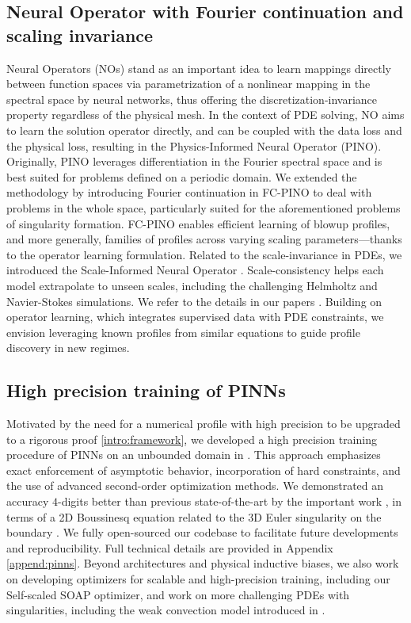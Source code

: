 \documentclass[12pt]{caltech_thesis}
\numberwithin{equation}{section}
\begin{document}
\subsection{Neural Operator with Fourier continuation and scaling invariance}
\label{subsec:no}
Neural Operators (NOs) \cite{li2020fourier,kovachki2023neural} stand as an important idea to learn mappings directly between function spaces via parametrization of a nonlinear mapping in the spectral space by neural networks, thus offering the discretization-invariance property regardless of the physical mesh. In the context of PDE solving, NO aims to learn the solution operator directly, and can be coupled with the data loss and the physical loss, resulting in the Physics-Informed Neural Operator (PINO). Originally, PINO leverages differentiation in the Fourier spectral space and is best suited for problems defined on a periodic domain. We extended the methodology by introducing  Fourier continuation in FC-PINO \cite{maust2022fourier} to deal with problems in the whole space, particularly suited for the aforementioned problems of singularity formation. FC-PINO enables efficient learning of blowup profiles, and more generally, families of profiles across varying scaling parameters—thanks to the operator learning formulation. Related to the scale-invariance in PDEs, we introduced the Scale-Informed Neural Operator \cite{li2024scale}. Scale-consistency helps each model
extrapolate to unseen scales, including the challenging Helmholtz and Navier-Stokes simulations. We refer to the details in our papers \cite{maust2022fourier,li2024scale}.
Building on operator learning, which integrates supervised data with PDE constraints, we envision leveraging known profiles from similar equations to guide profile discovery in new regimes.

\subsection{High precision training of PINNs}
\label{subsec:pinn}
Motivated by the need for a numerical profile with high precision to be upgraded to a rigorous proof \eqref{intro:framework}, we developed a high precision training procedure of PINNs on an unbounded domain in \cite{wang2025high}. This approach emphasizes exact enforcement of asymptotic behavior, incorporation of hard constraints, and the use of advanced second-order optimization methods. We demonstrated an accuracy $4$-digits better than previous state-of-the-art by the important work \cite{wang2023asymptotic}, in terms of a 2D Boussinesq equation related to the 3D Euler singularity on the boundary \cite{chen2022stable}. We fully open-sourced our codebase to facilitate future developments and reproducibility. Full technical details are provided in Appendix \ref{append:pinns}. Beyond architectures and physical inductive biases, we also work on developing optimizers for scalable and high-precision training, including our Self-scaled SOAP optimizer, and work on more challenging PDEs with singularities, including the weak convection model introduced in \cite{liu2017spatial}.
\end{document}
